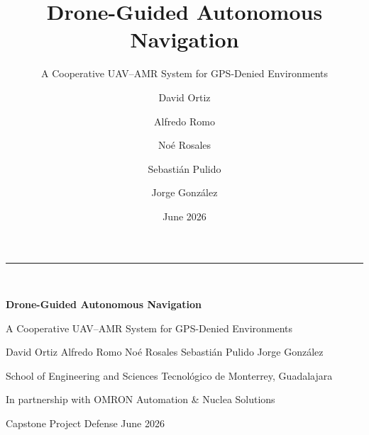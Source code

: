 \documentclass[aspectratio=169,11pt]{beamer}
\title[Cooperative UAV--AMR Navigation]{Drone-Guided Autonomous Navigation}
\subtitle{A Cooperative UAV--AMR System for GPS-Denied Environments}
\author[Ortiz \and Romo \and Rosales \and Pulido \and Gonz\'alez]%
{David Ortiz \and Alfredo Romo \and No\'e Rosales \and Sebasti\'an Pulido \and Jorge Gonz\'alez}
\institute{Tecnol\'ogico de Monterrey}
\date{June 2026}
\begin{document}
{%
\begin{frame}[plain]
\vfill
{\color{mAccent}\rule{0.16\paperwidth}{2.2pt}}\\[0.9em]
{\color{white}\bfseries Drone-Guided Autonomous Navigation\par}
\vspace*{0.5em}
{\large\color{white!80} A Cooperative UAV--AMR System for GPS-Denied Environments\par}
\vspace*{1.4em}
{\color{white!90}\normalsize David Ortiz \;\textperiodcentered\; Alfredo Romo \;\textperiodcentered\; No\'e Rosales \;\textperiodcentered\; Sebasti\'an Pulido \;\textperiodcentered\; Jorge Gonz\'alez\par}
\vspace*{1.0em}
{\color{white!70}\small School of Engineering and Sciences \;\textbar\; Tecnol\'ogico de Monterrey, Guadalajara\par}
\vspace*{0.3em}
{\color{white!55}\small In partnership with OMRON Automation \;\&\; Nuclea Solutions\par}
\vspace*{1.2em}
{\color{mAccent}\small Capstone Project Defense \;\textperiodcentered\; June 2026}
\vfill
\end{frame}
}
\end{document}
